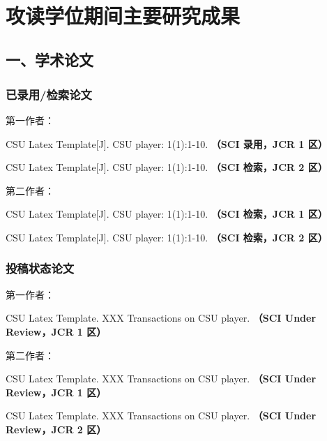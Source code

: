 {~}
\vspace{-9pt}
\section{攻读学位期间主要研究成果} %

\ifblindreview
\fi
\vspace{11pt}
\subsection*{一、学术论文}

\ifblindreview



\subsubsection*{已录用/检索论文}
第一作者：
\begin{enumerate}[label={[\arabic*]},itemindent=2em,wide]
\item CSU Latex Template[J]. CSU player: 1(1):1-10. {\bfseries \heiti（SCI 录用，JCR 1 区）}
\item CSU Latex Template[J]. CSU player: 1(1):1-10. {\bfseries \heiti（SCI 检索，JCR 2 区）}
\end{enumerate}
第二作者：
\begin{enumerate}[label={[\arabic*]},itemindent=2em,wide]
\item CSU Latex Template[J]. CSU player: 1(1):1-10. {\bfseries \heiti（SCI 检索，JCR 1 区）}
\item CSU Latex Template[J]. CSU player: 1(1):1-10. {\bfseries \heiti（SCI 检索，JCR 2 区）}
\end{enumerate}
\subsubsection*{投稿状态论文}
第一作者：
\begin{enumerate}[label={[\arabic*]},itemindent=2em,wide]
\item CSU Latex Template. XXX Transactions on CSU player. {\bfseries \heiti（SCI Under Review，JCR 1 区）}
\end{enumerate}
第二作者：
\begin{enumerate}[label={[\arabic*]},itemindent=2em,wide]
\item CSU Latex Template. XXX Transactions on CSU player. {\bfseries \heiti（SCI Under Review，JCR 1 区）}
\item CSU Latex Template. XXX Transactions on CSU player. {\bfseries \heiti（SCI Under Review，JCR 2 区）}
\end{enumerate}


